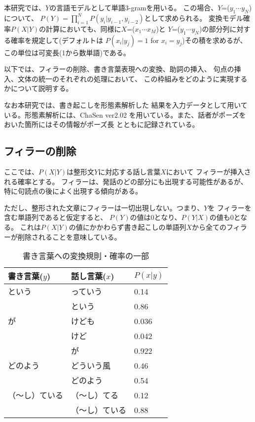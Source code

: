 本研究では、$Y$の言語モデルとして単語3-gramを用いる。
この場合、$Y$=($y_1 \cdots y_N$)について、
\(P(Y)=\prod_{i=1}^{N}P(y_i|y_{i-1},y_{i-2})\)として求められる。
変換モデル確率$P(X|Y)$の計算においても、同様に$X$=($x_1 \cdots x_M$)と
$Y$=($y_1 \cdots y_N$)の部分列に対する確率を規定して(デフォルトは
$P(x_i|y_j)=1$ for $x_i=y_j$)その積を求めるが、この単位は可変長(1から数単語)である。

以下では、フィラーの削除、書き言葉表現への変換、助詞の挿入、
句点の挿入、文体の統一のそれぞれの処理において、
この枠組みをどのように実現するかについて説明する。

なお本研究では、書き起こしを形態素解析した
結果を入力データとして用いている。形態素解析には、ChaSen ver2.02
を用いている。また、話者がポーズをおいた箇所にはその情報がポーズ長
とともに記録されている。

\subsection{フィラーの削除}

ここでは、$P(X|Y)$は整形文$Y$に対応する話し言葉$X$において
フィラーが挿入される確率とする。
フィラーは、発話のどの部分にも出現する可能性があるが、
特に句読点の後によく出現する傾向がある。

ただし、整形された文章にフィラーは一切出現しない。つまり、$Y$を
フィラーを含む単語列であると仮定すると、
$P(Y)$の値は0となり、$P(Y|X)$の値も0となる。
これは$P(X|Y)$の値にかかわらず書き起こしの単語列$X$から全てのフィラーが削除されることを意味している。

\begin{table}[t]
\small
\begin{center}
\caption{書き言葉への変換規則・確率の一部}\label{kakikae}
\vspace{2.0mm}
\begin{tabular}{|l|l|l|}					\hline
書き言葉($y$)		& 話し言葉($x$) 	& $P(x|y)$ 	\\\hline\hline
という			& っていう   		& 0.14		\\
			& という		& 0.86		\\\hline
が			& けども		& 0.036		\\
 			& けど 			& 0.042		\\
			& が			& 0.922		\\\hline
どのよう		& どういう風 		& 0.46		\\
			& どのよう		& 0.54		\\\hline
（〜し）ている		& （〜し）てる 		& 0.12		\\
			& （〜し）ている	& 0.88		\\\hline
\end{tabular}
\end{center}
\end{table}

